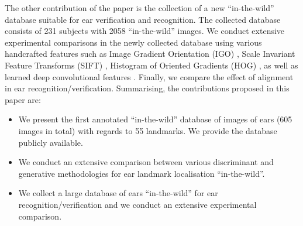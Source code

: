 
The other contribution of the paper is the collection of a new ``in-the-wild'' database suitable for ear
verification and recognition. The collected database consists of 231 subjects with 2058 ``in-the-wild'' images. We conduct extensive experimental comparisons in the newly collected database using various handcrafted features such as Image Gradient Orientation (IGO) \cite{tzimiropoulos2012subspace}, Scale Invariant Feature Transforms (SIFT) \cite{lowe1999object}, Histogram of Oriented Gradients (HOG) \cite{Dalal2005}, as well as learned deep convolutional features \cite{sermanet2013overfeat}. Finally, we compare the effect of alignment in ear recognition/verification.
Summarising, the contributions proposed in this paper are:
    \begin{itemize}
    \item We present the first annotated ``in-the-wild'' database of images of ears (605 images in total) with regards to 55 landmarks. We provide the database publicly available.
    \item We conduct an extensive comparison between various discriminant and generative methodologies for ear landmark localisation ``in-the-wild''.
    \item We collect a large database of ears ``in-the-wild'' for ear recognition/verification and we conduct an extensive experimental comparison. 
    \end{itemize}









